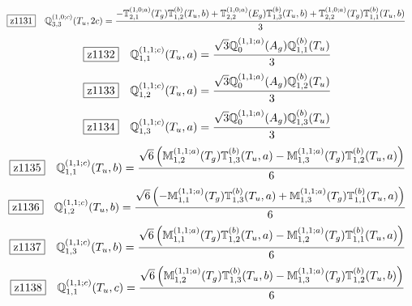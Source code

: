 \documentclass[fleqn,10pt,landscape]{jsarticle}
\begin{document}
\begin{dmath*}
\hspace*{3mm}\fbox{z1131}\quad \mathbb{Q}_{3,3}^{(1,0;c)}(T_{u},2c)=\frac{- \mathbb{T}_{2,1}^{(1,0;a)}(T_{g}) \mathbb{T}_{1,2}^{(b)}(T_{u},b) + \mathbb{T}_{2,2}^{(1,0;a)}(E_{g}) \mathbb{T}_{1,3}^{(b)}(T_{u},b) + \mathbb{T}_{2,2}^{(1,0;a)}(T_{g}) \mathbb{T}_{1,1}^{(b)}(T_{u},b)}{3}
\end{dmath*}
\begin{dmath*}
\hspace*{3mm}\fbox{z1132}\quad \mathbb{Q}_{1,1}^{(1,1;c)}(T_{u},a)=\frac{\sqrt{3} \mathbb{Q}_{0}^{(1,1;a)}(A_{g}) \mathbb{Q}_{1,1}^{(b)}(T_{u})}{3}
\end{dmath*}
\begin{dmath*}
\hspace*{3mm}\fbox{z1133}\quad \mathbb{Q}_{1,2}^{(1,1;c)}(T_{u},a)=\frac{\sqrt{3} \mathbb{Q}_{0}^{(1,1;a)}(A_{g}) \mathbb{Q}_{1,2}^{(b)}(T_{u})}{3}
\end{dmath*}
\begin{dmath*}
\hspace*{3mm}\fbox{z1134}\quad \mathbb{Q}_{1,3}^{(1,1;c)}(T_{u},a)=\frac{\sqrt{3} \mathbb{Q}_{0}^{(1,1;a)}(A_{g}) \mathbb{Q}_{1,3}^{(b)}(T_{u})}{3}
\end{dmath*}
\begin{dmath*}
\hspace*{3mm}\fbox{z1135}\quad \mathbb{Q}_{1,1}^{(1,1;c)}(T_{u},b)=\frac{\sqrt{6} \left(\mathbb{M}_{1,2}^{(1,1;a)}(T_{g}) \mathbb{T}_{1,3}^{(b)}(T_{u},a) - \mathbb{M}_{1,3}^{(1,1;a)}(T_{g}) \mathbb{T}_{1,2}^{(b)}(T_{u},a)\right)}{6}
\end{dmath*}
\begin{dmath*}
\hspace*{3mm}\fbox{z1136}\quad \mathbb{Q}_{1,2}^{(1,1;c)}(T_{u},b)=\frac{\sqrt{6} \left(- \mathbb{M}_{1,1}^{(1,1;a)}(T_{g}) \mathbb{T}_{1,3}^{(b)}(T_{u},a) + \mathbb{M}_{1,3}^{(1,1;a)}(T_{g}) \mathbb{T}_{1,1}^{(b)}(T_{u},a)\right)}{6}
\end{dmath*}
\begin{dmath*}
\hspace*{3mm}\fbox{z1137}\quad \mathbb{Q}_{1,3}^{(1,1;c)}(T_{u},b)=\frac{\sqrt{6} \left(\mathbb{M}_{1,1}^{(1,1;a)}(T_{g}) \mathbb{T}_{1,2}^{(b)}(T_{u},a) - \mathbb{M}_{1,2}^{(1,1;a)}(T_{g}) \mathbb{T}_{1,1}^{(b)}(T_{u},a)\right)}{6}
\end{dmath*}
\begin{dmath*}
\hspace*{3mm}\fbox{z1138}\quad \mathbb{Q}_{1,1}^{(1,1;c)}(T_{u},c)=\frac{\sqrt{6} \left(\mathbb{M}_{1,2}^{(1,1;a)}(T_{g}) \mathbb{T}_{1,3}^{(b)}(T_{u},b) - \mathbb{M}_{1,3}^{(1,1;a)}(T_{g}) \mathbb{T}_{1,2}^{(b)}(T_{u},b)\right)}{6}
\end{dmath*}
\end{document}
